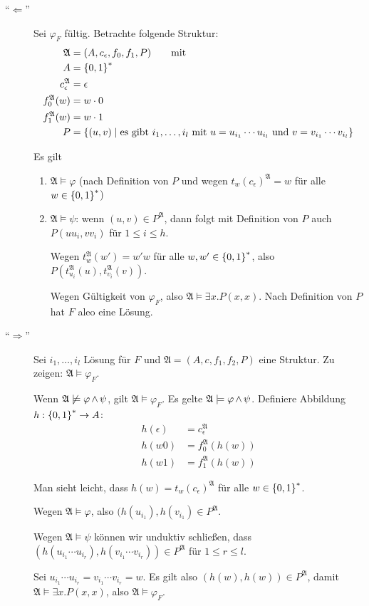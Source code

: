 \begin{description}
  \item[\enquote{$\Leftarrow$}]
  Sei $\varphi_F$ fültig. Betrachte folgende Struktur:
  \begin{align*}
    \mathfrak{A} &= (A, c_\epsilon, f_0, f_1, P) \qquad\text{mit} \\
    A &= \left\{0,1\right\}^*\\
    c_\epsilon^{\mathfrak{A}} &= \epsilon\\
    f_0^{\mathfrak{A}}(w) &= w \cdot 0\\
    f_1^{\mathfrak{A}}(w) &= w \cdot 1\\
    P &= \left\{(u,v) \mid \text{es gibt $i_1,\dots,i_l$ mit $u=u_{i_1}\cdots u_{i_l}$ und $v=v_{i_1}\cdots v_{i_l}$}\right\}
  \end{align*}
  
  Es gilt
  \begin{enumerate}
    \item $\mathfrak{A} \models \varphi$ (nach Definition von $P$ und wegen $t_w(c_\epsilon)^{\mathfrak{A}}=w$ für alle $w\in\left\{0,1\right\}^*$)
    \item $\mathfrak{A} \models \psi$: wenn $(u,v)\in P^{\mathfrak{A}}$, dann folgt mit Definition von $P$ auch $P(uu_i, vv_i)$ für $1\leq i\leq h$.
    
    Wegen $t_w^\mathfrak{A}(w') = w'w$ für alle $w,w'\in\left\{0,1\right\}^*$, also $P(t_{u_i}^\mathfrak{A}(u), t_{v_i}^\mathfrak{A}(v))$.

    Wegen Gültigkeit von $\varphi_F$, also $\mathfrak{A} \models \exists x.P(x,x)$. Nach Definition von $P$ hat $F$ aleo eine Lösung.
  \end{enumerate}
  
  \item[\enquote{$\Rightarrow$}]
  Sei $i_1,\dots,i_l$ Lösung für $F$ und $\mathfrak{A} = (A, c, f_1, f_2, P)$ eine Struktur. Zu zeigen: $\mathfrak{A}\models\varphi_F$.
  
  Wenn $\mathfrak{A}\not\models \varphi\operatorname{\wedge}\psi$, gilt $\mathfrak{A}\models\varphi_F$. Es gelte $\mathfrak{A}\models\varphi\operatorname{\wedge}\psi$.
  Definiere Abbildung $h : \left\{0,1\right\}^* \rightarrow A$:
  \begin{align*}
    h(\epsilon) &= c_\epsilon^\mathfrak{A}\\
    h(w0) &= f_0^{\mathfrak{A}}(h(w))\\
    h(w1) &= f_1^{\mathfrak{A}}(h(w))
  \end{align*}
  
  Man sieht leicht, dass $h(w)=t_w(c_\epsilon)^\mathfrak{A}$ für alle $w\in\left\{0,1\right\}^*$.
  
  Wegen $\mathfrak{A} \models \varphi$, also $(h(u_{i_1}), h(v_{i_1}) \in P^{\mathfrak{A}}$.
  
  Wegen $\mathfrak{A} \models \psi$ können wir unduktiv schließen, dass $(h(u_{i_1}\cdots u_{i_r}), h(v_{i_1}\cdots v_{i_r}))\in P^{\mathfrak{A}}$ für $1\leq r\leq l$.
  
  Sei $u_{i_1}\cdots u_{i_r} = v_{i_1}\cdots v_{i_r} = w$. Es gilt also $(h(w),h(w)) \in P^{\mathfrak{A}}$, damit $\mathfrak{A} \models \exists x.P(x,x)$, also $\mathfrak{A}\models\varphi_F$.
\end{description}

